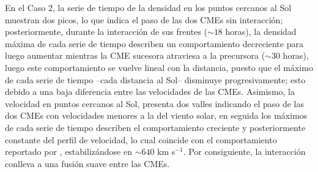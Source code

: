 En el Caso 2, la serie de tiempo de la densidad en los puntos cercanos al Sol muestran dos picos, lo que indica el paso de las dos CMEs sin interacción; posteriormente, durante la interacción de sus frentes ($\sim 18$ horas), la densidad máxima de cada serie de tiempo describen un comportamiento decreciente para luego aumentar mientras la CME sucesora atraviesa a la precursora ($\sim30$ horas), luego este comportamiento se vuelve lineal con la distancia, puesto que el máximo de cada serie de tiempo --cada distancia al Sol-- disminuye progresivamente; esto debido a una baja diferencia entre las velocidades de las CMEs. Asimismo, la velocidad en puntos cercanos al Sol, presenta dos valles indicando el paso de las dos CMEs con velocidades menores a la del viento solar, en seguida los máximos de cada serie de tiempo describen el comportamiento creciente y posteriormente constante del perfil de velocidad, lo cual coincide con el comportamiento reportado por , estabilizándose en $\sim640$ km s$^{-1}$. Por consiguiente, la interacción conlleva a una fusión suave entre las CMEs.
